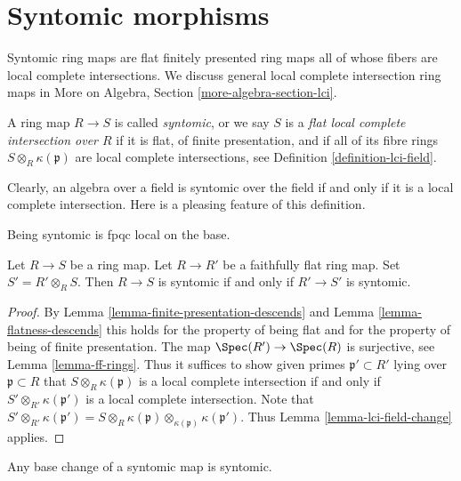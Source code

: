 \section{Syntomic morphisms}
\label{section-syntomic}

\noindent
Syntomic ring maps are flat finitely presented ring maps all of whose fibers
are local complete intersections. We discuss general local complete
intersection ring maps in
More on Algebra, Section \ref{more-algebra-section-lci}.

\begin{definition}
\label{definition-lci}
A ring map $R \to S$ is called {\it syntomic}, or we say $S$ is a
{\it flat local complete intersection over $R$}
if it is flat, of finite presentation, and if all of its fibre rings
$S \otimes_R \kappa(\mathfrak p)$ are local complete intersections,
see Definition \ref{definition-lci-field}.
\end{definition}

\noindent
Clearly, an algebra over a field is syntomic over the field
if and only if it is a local complete intersection. Here is
a pleasing feature of this definition.

\begin{lemma}
\label{lemma-syntomic-descends}
\begin{slogan}
Being syntomic is fpqc local on the base.
\end{slogan}
Let $R \to S$ be a ring map.
Let $R \to R'$ be a faithfully flat ring map.
Set $S' = R'\otimes_R S$.
Then $R \to S$ is syntomic if and only if $R' \to S'$ is syntomic.
\end{lemma}

\begin{proof}
By Lemma \ref{lemma-finite-presentation-descends} and
Lemma \ref{lemma-flatness-descends} this holds for the property
of being flat and for the property of being of finite presentation.
The map $\Spec(R') \to \Spec(R)$ is surjective,
see Lemma \ref{lemma-ff-rings}. Thus it suffices to show
given primes $\mathfrak p' \subset R'$ lying over $\mathfrak p \subset R$
that $S \otimes_R \kappa(\mathfrak p)$ is a local complete
intersection if and only if $S' \otimes_{R'} \kappa(\mathfrak p')$
is a local complete intersection. Note that
$S' \otimes_{R'} \kappa(\mathfrak p') =
S \otimes_R \kappa(\mathfrak p)
\otimes_{\kappa(\mathfrak p)} \kappa(\mathfrak p')$.
Thus Lemma \ref{lemma-lci-field-change} applies.
\end{proof}

\begin{lemma}
\label{lemma-base-change-syntomic}
Any base change of a syntomic map is syntomic.
\end{lemma}

